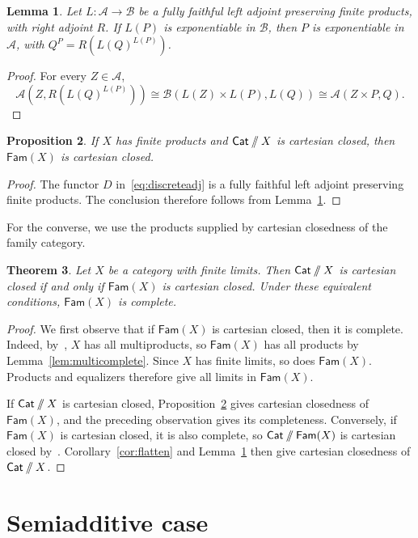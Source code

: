 \documentclass[11pt,a4paper]{amsart}
\newtheorem{theorem}{Theorem}[section]
\newtheorem{lemma}[theorem]{Lemma}
\newtheorem{proposition}[theorem]{Proposition}
\theoremstyle{definition}
\numberwithin{equation}{section}
\newcommand{\Cat}{\mathsf{Cat}}
\newcommand{\Fam}{\mathsf{Fam}}
\newcommand{\sslash}{\mathbin{/\mkern-6mu/}}
\newcommand{\DX}{\Cat\sslash X}
\begin{document}
\begin{lemma}\label{lem:coreflection}
Let $L:\mathcal A\to\mathcal B$ be a fully faithful left adjoint preserving finite products, with right adjoint $R$. If $L(P)$ is exponentiable in $\mathcal B$, then $P$ is exponentiable in $\mathcal A$, with $Q^P=R(L(Q)^{L(P)})$.
\end{lemma}
\begin{proof}
For every $Z\in\mathcal A$,
\[
 \mathcal A(Z,R(L(Q)^{L(P)}))
 \cong\mathcal B(L(Z)\times L(P),L(Q))
 \cong\mathcal A(Z\times P,Q).
\]
\end{proof}

\begin{proposition}\label{prop:necessary}
If $X$ has finite products and $\DX$ is cartesian closed, then $\Fam(X)$ is cartesian closed.
\end{proposition}
\begin{proof}
The functor $D$ in~\eqref{eq:discreteadj} is a fully faithful left adjoint preserving finite products. The conclusion therefore follows from Lemma~\ref{lem:coreflection}.
\end{proof}

For the converse, we use the products supplied by cartesian closedness of the family category.

\begin{theorem}\label{thm:lex}
Let $X$ be a category with finite limits. Then $\DX$ is cartesian closed if and only if $\Fam(X)$ is cartesian closed. Under these equivalent conditions, $\Fam(X)$ is complete.
\end{theorem}
\begin{proof}
We first observe that if $\Fam(X)$ is cartesian closed, then it is complete. Indeed, by~\cite[Theorem~2.11]{AR}, $X$ has all multiproducts, so $\Fam(X)$ has all products by Lemma~\ref{lem:multicomplete}. Since $X$ has finite limits, so does $\Fam(X)$. Products and equalizers therefore give all limits in $\Fam(X)$.

If $\DX$ is cartesian closed, Proposition~\ref{prop:necessary} gives cartesian closedness of $\Fam(X)$, and the preceding observation gives its completeness. Conversely, if $\Fam(X)$ is cartesian closed, it is also complete, so $\Cat\sslash\Fam(X)$ is cartesian closed by~\cite[Theorem~2.4]{CNP}. Corollary~\ref{cor:flatten} and Lemma~\ref{lem:coreflection} then give cartesian closedness of $\DX$.
\end{proof}

\section{Semiadditive case}\label{sec:further}
\end{document}
